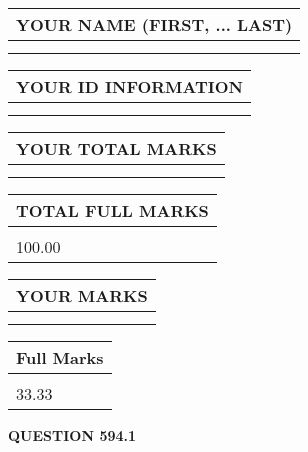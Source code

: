 \documentclass{ctexart}
\begin{document}
   
   
   
\newpage 
\setcounter{page}{ 
   594001 } 
   
   
   
   
\noindent\begin{tabular}{|l|}
\hline
YOUR NAME (FIRST, ... LAST)  \\
\hline
 \\ 
 \\ 
\hline
\end{tabular}
\hspace{0.05in} \begin{tabular}{|l|}
\hline
 YOUR   ID   INFORMATION  \\
\hline
 \\ 
 \\ 
\hline
\end{tabular}
   
   
\vspace{0.2in}\noindent\begin{tabular}{|l|}
\hline
YOUR TOTAL MARKS  \\
\hline
 \\ 
 \\ 
\hline
\end{tabular}
\hspace{0.05in} \begin{tabular}{|l|}
\hline
TOTAL FULL MARKS  \\
\hline
 \\ 
100.00 \\
\hline
\end{tabular}
   
   
 \vspace{0.2in}
 
 
 
 
   
   
  
\vspace{0.2in}
  
\noindent\begin{tabular}{|l|}
\hline
 YOUR MARKS  \\
\hline
 \\ 
 \\ 
\hline
\end{tabular}
\hspace{0.05in} \begin{tabular}{|l|}
\hline
 Full Marks  \\
\hline
 \\ 
33.33 \\
\hline
\end{tabular}
{\textbf{\Large{QUESTION
594.1 
}}}
  
\end{document}
